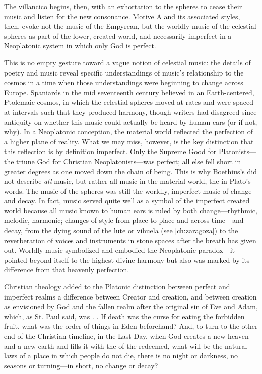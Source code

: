 The villancico begins, then, with an exhortation to the spheres to cease their
music and listen for the new consonance. 
Motive A and its associated styles, then, evoke not the music of the Empyrean,
but the worldly music of the celestial spheres as part of the lower, created
world, and necessarily imperfect in a Neoplatonic system in which only God is
perfect.

This is no empty gesture toward a vague notion of celestial music: the details
of poetry and music reveal specific understandings of music's relationship to
the cosmos in a time when those understandings were beginning to change across
Europe. 
Spaniards in the mid seventeenth century believed in an Earth-centered,
Ptolemaic cosmos, in which the celestial spheres moved at rates and were spaced
at intervals such that they produced harmony, though writers had disagreed since
antiquity on whether this music could actually be heard by human ears (or if
not, why).%
In a Neoplatonic conception, the material world reflected the perfection of a
higher plane of reality.%
    \citXXX[Neoplatonism]
What we may miss, however, is the key distinction that this reflection is by
definition imperfect.
Only the Supreme Good for Platonists---the triune God for Christian
Neoplatonists---was perfect; all else fell short in greater degrees as one moved
down the chain of being. 
This is why Boethius's  did not describe \emph{all} music,
but rather all music in the material world, the  in Plato's words.
The music of the spheres was still the worldly, imperfect music of change and
decay.
In fact, music served quite well as a symbol of the imperfect created world
because all music known to human ears is ruled by both change---rhythmic,
melodic, harmonic; changes of style from place to place and across time---and
decay, from the dying sound of the lute or vihuela (see \cref{ch:zaragoza}) to
the reverberation of voices and instruments in stone spaces after the breath has
given out.
Worldly music symbolized and embodied the Neoplatonic paradox---it pointed
beyond itself to the highest divine harmony but also was marked by its
difference from that heavenly perfection.

Christian theology added to the Platonic distinction between perfect and
imperfect realms a difference between Creator and creation, and between creation
as envisioned by God and the fallen realm after the original sin of Eve and
Adam, which, as St. Paul said, was .%
. 
If death was the curse for eating the forbidden fruit, what was the order of
things in Eden beforehand?
And, to turn to the other end of the Christian timeline, in the Last Day, when
God creates a new heaven and a new earth and fills it with the  of the redeemed, what will be the natural laws of a place in which
people do not die, there is no night or darkness, no seasons or turning---in
short, no change or decay?

